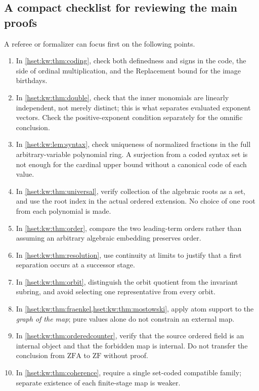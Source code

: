 \documentclass[11pt,letterpaper]{article}
\theoremstyle{definition}
\theoremstyle{remark}
\newcommand{\ZF}{\mathrm{ZF}}
\newcommand{\ZFA}{\mathrm{ZFA}}
\begin{document}
\subsection{A compact checklist for reviewing the main proofs}
\label{hset:kw:app:checklist}
A referee or formalizer can focus first on the following points.
\begin{enumerate}
\item In \cref{hset:kw:thm:coding}, check both definedness and signs in the code, the side of ordinal multiplication, and the Replacement bound for the image birthdays.
\item In \cref{hset:kw:thm:double}, check that the inner monomials are linearly independent, not merely distinct; this is what separates evaluated exponent vectors. Check the positive-exponent condition separately for the omnific conclusion.
\item In \cref{hset:kw:lem:syntax}, check uniqueness of normalized fractions in the full arbitrary-variable polynomial ring. A surjection from a coded syntax set is not enough for the cardinal upper bound without a canonical code of each value.
\item In \cref{hset:kw:thm:universal}, verify collection of the algebraic roots as a set, and use the root index in the actual ordered extension. No choice of one root from each polynomial is made.
\item In \cref{hset:kw:thm:order}, compare the two leading-term orders rather than assuming an arbitrary algebraic embedding preserves order.
\item In \cref{hset:kw:thm:resolution}, use continuity at limits to justify that a first separation occurs at a successor stage.
\item In \cref{hset:kw:thm:orbit}, distinguish the orbit quotient from the invariant subring, and avoid selecting one representative from every orbit.
\item In \cref{hset:kw:thm:fraenkel,hset:kw:thm:mostowski}, apply atom support to the \emph{graph of the map}; pure values alone do not constrain an external map.
\item In \cref{hset:kw:thm:orderedcounter}, verify that the source ordered field is an internal object and that the forbidden map is internal. Do not transfer the conclusion from $\ZFA$ to $\ZF$ without proof.
\item In \cref{hset:kw:thm:coherence}, require a single set-coded compatible family; separate existence of each finite-stage map is weaker.
\end{enumerate}
\end{document}
